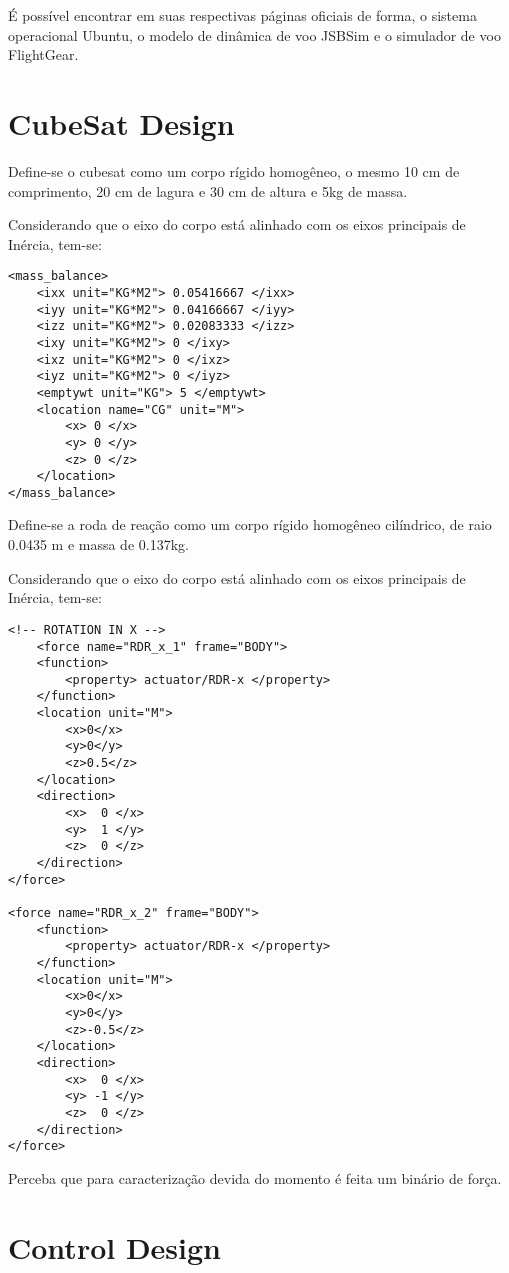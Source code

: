 É possível encontrar em suas respectivas páginas oficiais de forma, o sistema operacional Ubuntu, o modelo de dinâmica de voo JSBSim e o simulador de voo FlightGear.

\section{CubeSat Design}

Define-se o cubesat como um corpo rígido homogêneo, o mesmo 10 cm de comprimento, 20 cm de lagura e 30 cm de altura e 5kg de massa.

Considerando que o eixo do corpo está alinhado com os eixos principais de Inércia, tem-se:

\begin{verbatim}
<mass_balance>
	<ixx unit="KG*M2"> 0.05416667 </ixx>
	<iyy unit="KG*M2"> 0.04166667 </iyy>
	<izz unit="KG*M2"> 0.02083333 </izz>
	<ixy unit="KG*M2"> 0 </ixy>
	<ixz unit="KG*M2"> 0 </ixz>
	<iyz unit="KG*M2"> 0 </iyz>
	<emptywt unit="KG"> 5 </emptywt>
	<location name="CG" unit="M">
		<x> 0 </x>
		<y> 0 </y>
		<z> 0 </z>
	</location>
</mass_balance>

\end{verbatim}

Define-se a roda de reação como um corpo rígido homogêneo cilíndrico, de raio 0.0435 m e massa de 0.137kg.

Considerando que o eixo do corpo está alinhado com os eixos principais de Inércia, tem-se:

\begin{verbatim}
<!-- ROTATION IN X -->
	<force name="RDR_x_1" frame="BODY">
	<function>
		<property> actuator/RDR-x </property>
	</function>
	<location unit="M">
		<x>0</x>
		<y>0</y>
		<z>0.5</z>
	</location>
	<direction>
		<x>  0 </x>
		<y>  1 </y>
		<z>  0 </z>
	</direction>
</force>

<force name="RDR_x_2" frame="BODY">
	<function>
		<property> actuator/RDR-x </property>
	</function>
	<location unit="M">
		<x>0</x>
		<y>0</y>
		<z>-0.5</z>
	</location>
	<direction>
		<x>  0 </x>
		<y> -1 </y>
		<z>  0 </z>
	</direction>
</force>
\end{verbatim}

Perceba que para caracterização devida do momento é feita um binário de força.

\section{Control Design}

